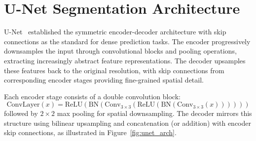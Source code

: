 \documentclass[a4paper]{report}
\begin{document}
\section{U-Net Segmentation Architecture}
\label{sec:unet}
U-Net~\cite{ronneberger2015unet} established the symmetric encoder-decoder architecture with skip connections as the standard for dense prediction tasks. The encoder progressively downsamples the input through convolutional blocks and pooling operations, extracting increasingly abstract feature representations. The decoder upsamples these features back to the original resolution, with skip connections from corresponding encoder stages providing fine-grained spatial detail.

Each encoder stage consists of a double convolution block:
\begin{equation}
    \text{ConvLayer}(x) = \text{ReLU}(\text{BN}(\text{Conv}_{3\times3}(\text{ReLU}(\text{BN}(\text{Conv}_{3\times3}(x))))))
\end{equation}
followed by $2\times2$ max pooling for spatial downsampling. The decoder mirrors this structure using bilinear upsampling and concatenation (or addition) with encoder skip connections, as illustrated in Figure~\ref{fig:unet_arch}.
\end{document}
